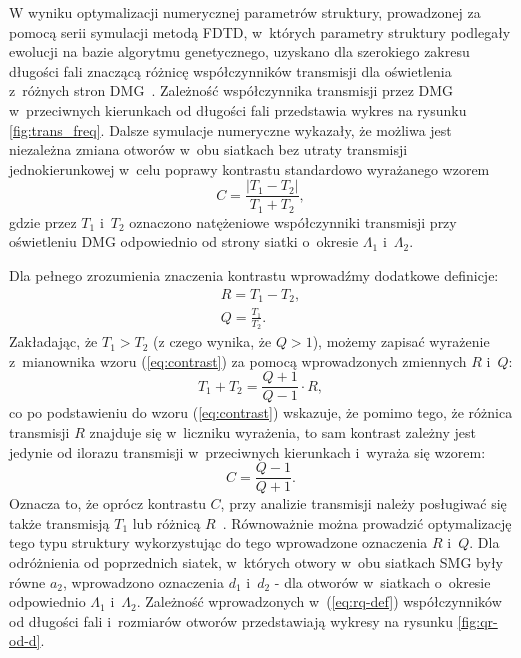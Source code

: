 W wyniku optymalizacji numerycznej parametrów struktury, prowadzonej za pomocą serii symulacji metodą FDTD, w~których parametry struktury podlegały ewolucji na bazie algorytmu genetycznego, uzyskano dla szerokiego zakresu długości fali znaczącą różnicę współczynników transmisji dla oświetlenia z~różnych stron DMG~\cite{Stolarek:13}. Zależność współczynnika transmisji przez DMG w~przeciwnych kierunkach od długości fali przedstawia wykres na rysunku \ref{fig:trans_freq}. Dalsze symulacje numeryczne wykazały, że możliwa jest niezależna zmiana otworów w~obu siatkach bez utraty transmisji jednokierunkowej w~celu poprawy kontrastu standardowo wyrażanego wzorem
\begin{equation}
C=\frac{|T_1 - T_2|}{T_1+T_2},
\label{eq:contrast}
\end{equation}
gdzie przez $T_1$ i~$T_2$ oznaczono natężeniowe współczynniki transmisji przy oświetleniu DMG odpowiednio od strony siatki o~okresie $\Lambda_1$ i~$\Lambda_2$.

Dla pełnego zrozumienia znaczenia kontrastu wprowadźmy dodatkowe definicje:
\begin{equation}
	\begin{gathered}
	R=T_1-T_2, \\
	Q=\frac{T_1}{T_2}.
	\end{gathered}
	\label{eq:rq-def}
\end{equation}
Zakładając, że $T_1>T_2$ (z czego wynika, że $Q>1$), możemy zapisać wyrażenie z~mianownika wzoru (\ref{eq:contrast}) za pomocą wprowadzonych zmiennych $R$ i~$Q$:
\begin{equation}
	T_1+T_2=\frac{Q+1}{Q-1} \cdot R,
\end{equation}
co po podstawieniu do wzoru (\ref{eq:contrast}) wskazuje, że pomimo tego, że różnica transmisji $R$  znajduje się w~liczniku wyrażenia, to sam kontrast zależny jest jedynie od ilorazu transmisji w~przeciwnych kierunkach i~wyraża się wzorem:
\begin{equation}
	C=\frac{Q-1}{Q+1}
	\label{eq:contrast-Q}.
\end{equation}
Oznacza to, że oprócz kontrastu $C$, przy analizie transmisji należy posługiwać się także transmisją $T_1$ lub różnicą $R$~\cite{stolarek2013broadband}. Równoważnie można prowadzić optymalizację tego typu struktury wykorzystując do tego wprowadzone oznaczenia $R$ i~$Q$. Dla odróżnienia od poprzednich siatek, w~których otwory w~obu siatkach SMG były równe $a_2$, wprowadzono oznaczenia $d_1$ i~$d_2$ - dla otworów w~siatkach o~okresie odpowiednio $\Lambda_1$ i~$\Lambda_2$. Zależność wprowadzonych w~(\ref{eq:rq-def}) współczynników od długości fali i~rozmiarów otworów przedstawiają wykresy na rysunku \ref{fig:qr-od-d}.

